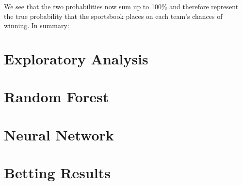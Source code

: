 \documentclass [MS] {uclathes}
\begin{document}
We see that the two probabilities now sum up to 100\% and therefore represent the true probability that the sportsbook places on each team's chances of winning. In summary: \\

\begin{table}[ht!]
\caption{Summary of betting values for sample wager}
\label{tab:bet-summary-table}
\end{table}



\chapter{Exploratory Analysis}

\chapter{Random Forest}

\chapter{Neural Network}

\chapter{Betting Results}
\end{document}
